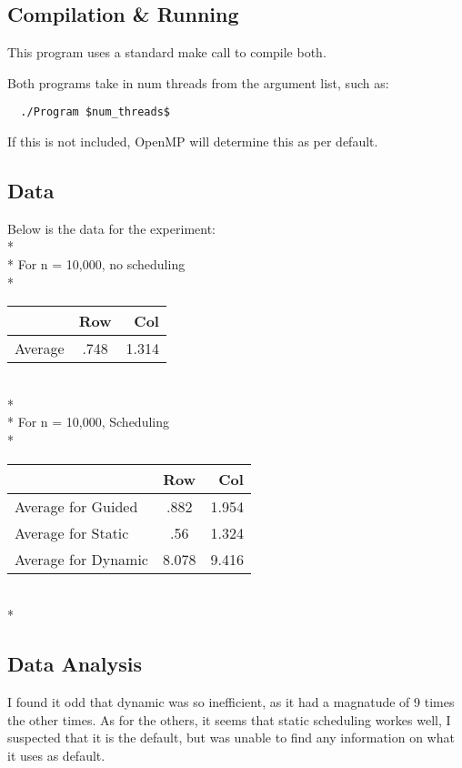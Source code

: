 \documentclass[dvips]{article}
\begin{document}
\subsection{Compilation \& Running}
 This program uses a standard make call to compile both.

 Both programs take in num threads from the argument list, such as:
 \begin{verbatim}
  ./Program $num_threads$
  \end{verbatim}

 If this is not included, OpenMP will determine this as per default.

\subsection{Data}
Below is the data for the experiment:
\\*
\\*
For n = 10,000, no scheduling
\\*
\begin{tabular}{ l | c r }
   & Row & Col \\
  \hline
  Average & .748 &  1.314\\
  \hline

\end{tabular}
\\*
\\*
For n = 10,000, Scheduling
\\*
\begin{tabular}{ l | c r }
   & Row & Col \\
  \hline
  Average for Guided & .882 &  1.954\\
  \hline
   Average for Static & .56 &  1.324\\
  \hline
   Average for Dynamic & 8.078 &  9.416\\
  \hline
\end{tabular}
\\*
\subsection{Data Analysis}

I found it odd that dynamic was so inefficient, as it had a magnatude of 9 times the other times. 
As for the others, it seems that static scheduling workes well, I suspected that it is the default, but was
unable to find any information on what it uses as default.
\end{document}
